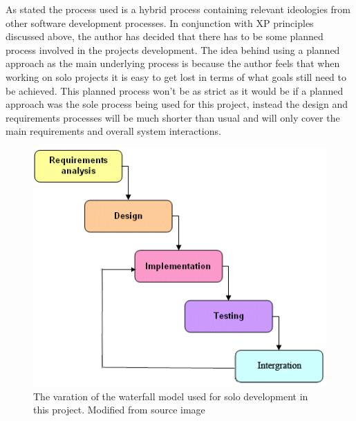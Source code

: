 As stated the process used is a hybrid process containing relevant ideologies from other software development processes. In conjunction with XP principles discussed above, the author has decided that there has to be some planned process involved in the projects development. The idea behind using a planned approach as the main underlying process is because the author feels that when working on solo projects it is easy to get lost in terms of what goals still need to be achieved. This planned process won’t be as strict as it would be if a planned approach was the sole process being used for this project, instead the design and requirements processes will be much shorter than usual and will only cover the main requirements and overall system interactions. 

\begin{figure}[h!]
\centering
\includegraphics[scale=0.7]{Images/chapter3/waterfallmodel}
\caption{The varation of the waterfall model used for solo development in this project. Modified from source image \cite{waterfall:image} }
\label{fig:waterfall}
\end{figure}

